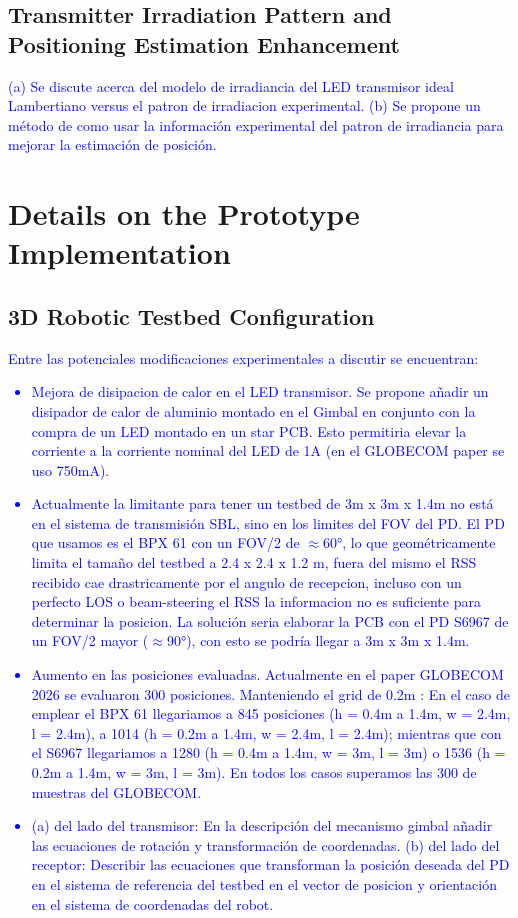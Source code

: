 \documentclass[journal]{IEEEtran}
\begin{document}
    \subsection{Transmitter Irradiation Pattern and Positioning Estimation Enhancement}
    \textcolor{blue}{ (a) Se discute acerca del modelo de irradiancia del LED transmisor ideal Lambertiano versus el patron de irradiacion experimental. (b) Se propone un método de como usar la información experimental del patron de irradiancia para mejorar la estimación de posición.}

\section{Details on the Prototype Implementation}
    \subsection{3D Robotic Testbed Configuration }
    \textcolor{blue}{
        Entre las potenciales modificaciones experimentales a discutir se encuentran:
        \begin{itemize}
            \item Mejora de disipacion de calor en el LED transmisor. Se propone añadir un disipador de calor de aluminio montado en el Gimbal en conjunto con la compra de un LED montado en un star PCB. Esto permitiria elevar la corriente a la corriente nominal del LED de 1A (en el GLOBECOM paper se uso 750mA).
            \item Actualmente la limitante para tener un testbed de 3m x 3m x 1.4m no está en el sistema de transmisión SBL, sino en los limites del FOV del PD. El PD que usamos es el BPX 61 con un FOV/2 de $\approx$60°, lo que geométricamente limita el tamaño del testbed a 2.4 x 2.4 x 1.2 m, fuera del mismo el RSS recibido cae drastricamente por el angulo de recepcion, incluso con un perfecto LOS o beam-steering el RSS la informacion no es suficiente para determinar la posicion. La solución seria elaborar la PCB con el PD S6967 de un FOV/2 mayor ($\approx$90°), con esto se podría llegar a 3m x 3m x 1.4m.
            \item Aumento en las posiciones evaluadas. Actualmente en el paper GLOBECOM 2026 se evaluaron 300 posiciones. Manteniendo el grid de 0.2m : En el caso de emplear el BPX 61 llegariamos a 845 posiciones (h = 0.4m a 1.4m, w = 2.4m, l = 2.4m), a 1014 (h = 0.2m a 1.4m, w = 2.4m, l = 2.4m); mientras que con el S6967 llegariamos a 1280 (h = 0.4m a 1.4m, w = 3m, l = 3m) o 1536 (h = 0.2m a 1.4m, w = 3m, l = 3m). En todos los casos superamos las 300 de muestras del GLOBECOM.
            \item (a) del lado del transmisor: En la descripción del mecanismo gimbal añadir las ecuaciones de rotación y transformación de coordenadas. (b) del lado del receptor: Describir las ecuaciones que transforman la posición deseada del PD en el sistema de referencia del testbed en el vector de posicion y orientación en el sistema de coordenadas del robot.
        \end{itemize}
        }
\end{document}
